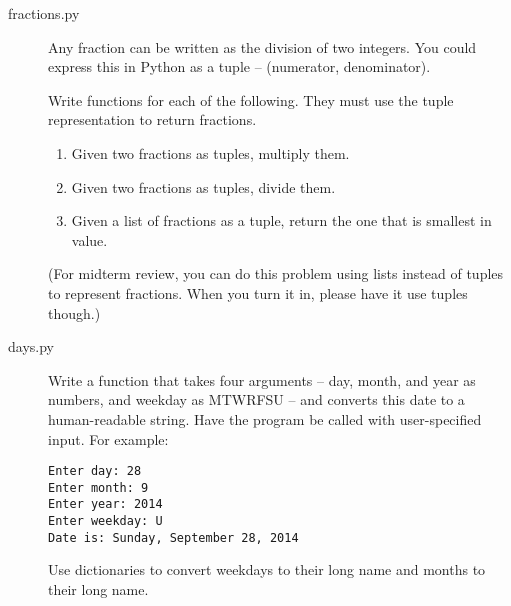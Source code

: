 \documentclass[11pt]{cselabheader}
\begin{document}
\begin{description}
  \item[fractions.py] Any fraction can be written as the division of two
    integers. You could express this in Python as a tuple -- 
    (numerator, denominator).

    Write functions for each of the following. They must use the tuple
    representation to return fractions.
    \begin{enumerate}
      \item Given two fractions as tuples, multiply them.
      \item Given two fractions as tuples, divide them.
      \item Given a list of fractions as a tuple, return the one that is
        smallest in value.
    \end{enumerate}

    (For midterm review, you can do this problem using lists instead of 
    tuples to represent fractions. When you turn it in, please have it use
    tuples though.)


  \item[days.py] Write a function that takes four arguments -- day, month, and
    year as numbers, and weekday as MTWRFSU -- and converts this date to a
    human-readable string. Have the program be called with user-specified
    input. For example:
    \begin{lstlisting}[style=bash]
Enter day: 28
Enter month: 9
Enter year: 2014
Enter weekday: U
Date is: Sunday, September 28, 2014
    \end{lstlisting}

    Use dictionaries to convert weekdays to their long name and months to their
    long name.



%


\end{description}
\end{document}
